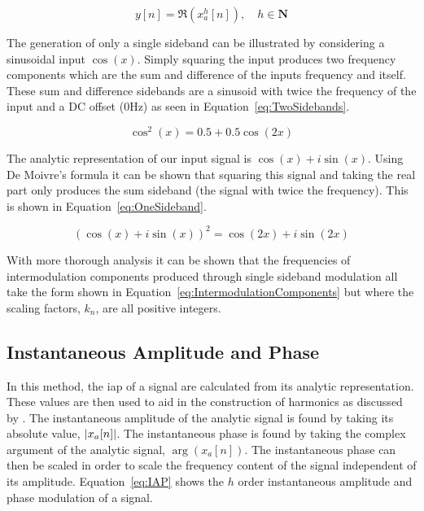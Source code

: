 		\begin{equation}
			y[n] = \Re \left( x_{a}^{h}[n] \right), \quad h \in \textbf{N}
			\label{eq:SSB}
		\end{equation}

		The generation of only a single sideband can be illustrated by considering a sinusoidal input $\cos(x)$.
		Simply squaring the input produces two frequency components which are the sum and difference of the inputs
		frequency and itself. These sum and difference sidebands are a sinusoid with twice the frequency of the
		input and a DC offset (0Hz) as seen in Equation~\ref{eq:TwoSidebands}.

		\begin{equation}
			\cos^{2}(x) = 0.5 + 0.5 \cos(2x)
			\label{eq:TwoSidebands}
		\end{equation}

		The analytic representation of our input signal is $\cos(x) + i\sin(x)$. Using De Moivre's formula it can
		be shown that squaring this signal and taking the real part only produces the sum sideband (the signal with
		twice the frequency). This is shown in Equation~\ref{eq:OneSideband}.

		\begin{equation}
			\left( \cos(x) + i\sin(x) \right)^{2} = \cos(2x) + i\sin(2x)
			\label{eq:OneSideband}
		\end{equation}

		With more thorough analysis it can be shown that the frequencies of intermodulation components produced
		through single sideband modulation all take the form shown in Equation~\ref{eq:IntermodulationComponents}
		but where the scaling factors, $k_{n}$, are all positive integers.

	\subsection{Instantaneous Amplitude and Phase}
	\label{sec:Excitation-Methods-IAP}
		In this method, the \acrfull{iap} of a signal are calculated from its analytic representation. These values
		are then used to aid in the construction of harmonics as discussed by \citet{puckette2007patch}. The
		instantaneous amplitude of the analytic signal is found by taking its absolute value, $\left|x_{a}[n]\right|$. The
		instantaneous phase is found by taking the complex argument of the analytic signal, $\arg(x_{a}[n])$. The
		instantaneous phase can then be scaled in order to scale the frequency content of the signal independent of
		its amplitude.  Equation~\ref{eq:IAP} shows the $h$ order instantaneous amplitude and phase
		modulation of a signal.

